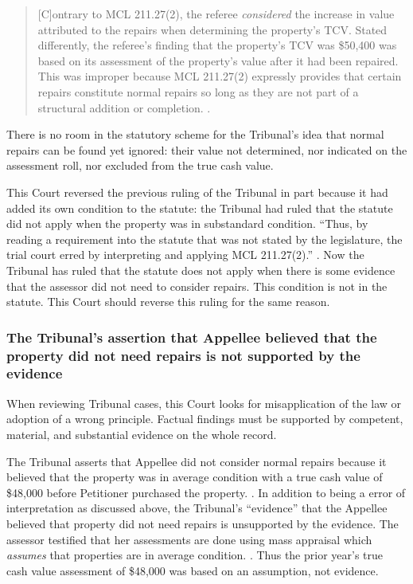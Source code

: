 \documentclass[12pt,\documentclassflag]{michiganCourtOfAppealsBrief}
\begin{document}
\begin{quote}
[C]ontrary to MCL 211.27(2), the referee {\em considered} the increase in value attributed to the repairs when determining the property's TCV. Stated differently, the referee's finding that the property's TCV was \$50,400 was based on its assessment of the property's value after it had been repaired. This was improper because MCL 211.27(2) expressly provides that certain repairs constitute normal repairs so long as they are not part of a structural addition or completion. .
\end{quote}

There is no room in the statutory scheme for the Tribunal's idea that normal repairs can be found yet ignored: their value not determined, nor indicated on the assessment roll, nor excluded from the true cash value.

This Court reversed the previous ruling of the Tribunal in part because it had added its own condition to the statute: the Tribunal had ruled that the statute did not apply when the property was in substandard condition. ``Thus, by reading a requirement into the statute that was not stated by the legislature, the trial court erred by interpreting and applying MCL 211.27(2).'' . Now the Tribunal has ruled that the statute does not apply when there is some evidence that the assessor did not need to consider repairs. This condition is not in the statute. This Court should reverse this ruling for the same reason.

\subsubsection{The Tribunal's assertion that Appellee believed that the property did not need repairs is not supported by the evidence}
When reviewing Tribunal cases, this Court looks for misapplication of the law or adoption of a wrong principle. Factual findings must be supported by competent, material, and substantial evidence on the whole record. 

The Tribunal asserts that Appellee did not consider normal repairs because it believed that the property was in average condition with a true cash value of \$48,000 before Petitioner purchased the property. \reconsiderationDenied[2].  
In addition to being a error of interpretation as discussed above, the Tribunal's ``evidence'' that the Appellee believed that property did not need repairs is unsupported by the evidence. The assessor testified that her assessments are done using mass appraisal which {\em assumes} that properties are in average condition. \foj[4]. Thus the prior year's true cash value assessment of \$48,000 was based on an assumption, not evidence.
\end{document}
